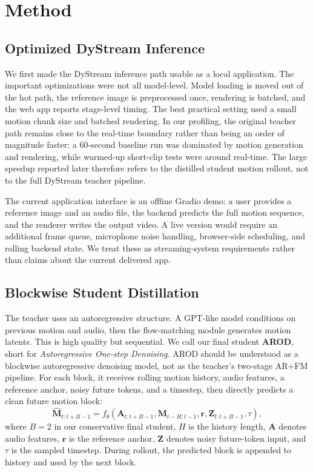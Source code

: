\documentclass{article}
\begin{document}
\section{Method}

\subsection{Optimized DyStream Inference}

We first made the DyStream inference path usable as a local application. The important optimizations were not all model-level. Model loading is moved out of the hot path, the reference image is preprocessed once, rendering is batched, and the web app reports stage-level timing. The best practical setting used a small motion chunk size and batched rendering. In our profiling, the original teacher path remains close to the real-time boundary rather than being an order of magnitude faster: a 60-second baseline run was dominated by motion generation and rendering, while warmed-up short-clip tests were around real-time. The large speedup reported later therefore refers to the distilled student motion rollout, not to the full DyStream teacher pipeline.

The current application interface is an offline Gradio demo: a user provides a reference image and an audio file, the backend predicts the full motion sequence, and the renderer writes the output video. A live version would require an additional frame queue, microphone noise handling, browser-side scheduling, and rolling backend state. We treat these as streaming-system requirements rather than claims about the current delivered app.

\subsection{Blockwise Student Distillation}

The teacher uses an autoregressive structure. A GPT-like model conditions on previous motion and audio, then the flow-matching module generates motion latents. This is high quality but sequential. We call our final student \textbf{AROD}, short for \textit{Autoregressive One-step Denoising}. AROD should be understood as a blockwise autoregressive denoising model, not as the teacher's two-stage AR+FM pipeline. For each block, it receives rolling motion history, audio features, a reference anchor, noisy future tokens, and a timestep, then directly predicts a clean future motion block:
\begin{equation}
    \hat{\mathbf{M}}_{t:t+B-1}
    =
    f_\theta(
      \mathbf{A}_{t:t+B-1},
      \mathbf{M}_{t-H:t-1},
      \mathbf{r},
      \mathbf{Z}_{t:t+B-1},
      \tau
    ),
\end{equation}
where $B=2$ in our conservative final student, $H$ is the history length, $\mathbf{A}$ denotes audio features, $\mathbf{r}$ is the reference anchor, $\mathbf{Z}$ denotes noisy future-token input, and $\tau$ is the sampled timestep. During rollout, the predicted block is appended to history and used by the next block.
\end{document}
